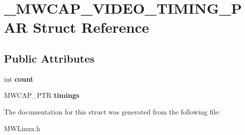 \hypertarget{struct__MWCAP__VIDEO__TIMING__PAR}{\section{\-\_\-\-M\-W\-C\-A\-P\-\_\-\-V\-I\-D\-E\-O\-\_\-\-T\-I\-M\-I\-N\-G\-\_\-\-P\-A\-R Struct Reference}
\label{struct__MWCAP__VIDEO__TIMING__PAR}
}
\subsection*{Public Attributes}
\begin{DoxyCompactItemize}
\item 
\hypertarget{struct__MWCAP__VIDEO__TIMING__PAR_a448ae8f9e9ce729f221d2c0ce91acdf4}{int {\bfseries count}}\label{struct__MWCAP__VIDEO__TIMING__PAR_a448ae8f9e9ce729f221d2c0ce91acdf4}

\item 
\hypertarget{struct__MWCAP__VIDEO__TIMING__PAR_aed3c1941bcfb84872d720fd4f1358045}{M\-W\-C\-A\-P\-\_\-\-P\-T\-R {\bfseries timings}}\label{struct__MWCAP__VIDEO__TIMING__PAR_aed3c1941bcfb84872d720fd4f1358045}

\end{DoxyCompactItemize}


The documentation for this struct was generated from the following file\-:\begin{DoxyCompactItemize}
\item 
M\-W\-Linux.\-h\end{DoxyCompactItemize}
